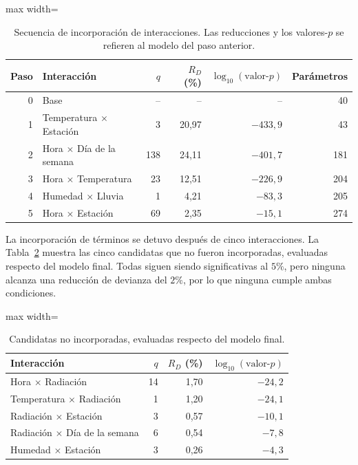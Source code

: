 \documentclass[12pt, a4paper]{article}
\numberwithin{equation}{section}
\begin{document}
\begin{table}[htbp]
\centering\small
\caption{Secuencia de incorporación de interacciones. Las reducciones y los valores-$p$ se refieren al modelo del paso anterior.}
\label{tab:res_pasos}
\begin{adjustbox}{max width=\linewidth}
\begin{tabular}{rlrrrr}\toprule
Paso & Interacción & $q$ & $R_D$ (\%) & $\log_{10}(\text{valor-}p)$ & Parámetros \\\midrule
0 & Base & -- & -- & -- & 40 \\
1 & Temperatura $\times$ Estación & 3 & 20{,}97 & $-433{,}9$ & 43 \\
2 & Hora $\times$ Día de la semana & 138 & 24{,}11 & $-401{,}7$ & 181 \\
3 & Hora $\times$ Temperatura & 23 & 12{,}51 & $-226{,}9$ & 204 \\
4 & Humedad $\times$ Lluvia & 1 & 4{,}21 & $-83{,}3$ & 205 \\
5 & Hora $\times$ Estación & 69 & 2{,}35 & $-15{,}1$ & 274 \\\bottomrule
\end{tabular}
\end{adjustbox}
\end{table}

La incorporación de términos se detuvo después de cinco interacciones. La Tabla~\ref{tab:res_restantes} muestra las cinco candidatas que no fueron incorporadas, evaluadas respecto del modelo final. Todas siguen siendo significativas al $5\%$, pero ninguna alcanza una reducción de devianza del $2\%$, por lo que ninguna cumple ambas condiciones.

\begin{table}[htbp]
\centering\small
\caption{Candidatas no incorporadas, evaluadas respecto del modelo final.}
\label{tab:res_restantes}
\begin{adjustbox}{max width=\linewidth}
\begin{tabular}{lrrr}\toprule
Interacción & $q$ & $R_D$ (\%) & $\log_{10}(\text{valor-}p)$ \\\midrule
Hora $\times$ Radiación & 14 & 1{,}70 & $-24{,}2$ \\
Temperatura $\times$ Radiación & 1 & 1{,}20 & $-24{,}1$ \\
Radiación $\times$ Estación & 3 & 0{,}57 & $-10{,}1$ \\
Radiación $\times$ Día de la semana & 6 & 0{,}54 & $-7{,}8$ \\
Humedad $\times$ Estación & 3 & 0{,}26 & $-4{,}3$ \\\bottomrule
\end{tabular}
\end{adjustbox}
\end{table}
\end{document}
